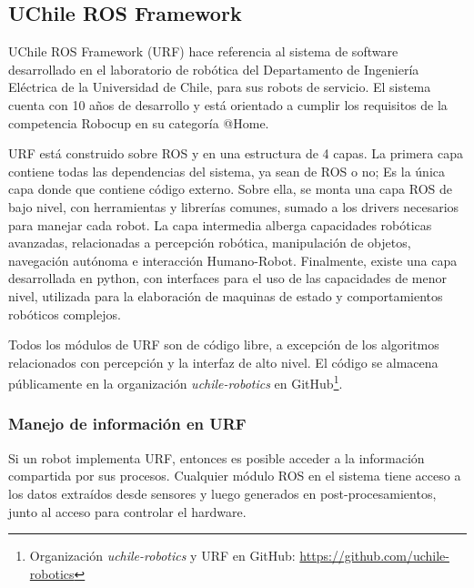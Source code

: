 

\subsection{UChile ROS Framework}

UChile ROS Framework (URF) hace referencia al sistema de software desarrollado en el laboratorio de robótica del Departamento de Ingeniería Eléctrica de la Universidad de Chile, para sus robots de servicio. El sistema cuenta con 10 años de desarrollo y está orientado a cumplir los requisitos de la competencia Robocup en su categoría @Home.

URF está construido sobre ROS y en una estructura de 4 capas. La primera capa contiene todas las dependencias del sistema, ya sean de ROS o no; Es la única capa donde que contiene código externo. Sobre ella, se monta una capa ROS de bajo nivel, con herramientas y librerías comunes, sumado a los drivers necesarios para manejar cada robot. La capa intermedia alberga capacidades robóticas avanzadas, relacionadas a percepción robótica, manipulación de objetos, navegación autónoma e interacción Humano-Robot. Finalmente, existe una capa desarrollada en python, con interfaces para el uso de las capacidades de menor nivel, utilizada para la elaboración de maquinas de estado y comportamientos robóticos complejos.


Todos los módulos de URF son de código libre, a excepción de los algoritmos relacionados con percepción y la interfaz de alto nivel. El código se almacena públicamente en la organización \textit{uchile-robotics} en GitHub\footnote{Organización \textit{uchile-robotics} y URF en GitHub: \url{https://github.com/uchile-robotics}}.




\subsubsection{Manejo de información en URF}

Si un robot implementa URF, entonces es posible acceder a la información compartida por sus procesos. Cualquier módulo ROS en el sistema tiene acceso a los datos extraídos desde sensores y luego generados en post-procesamientos, junto al acceso para controlar el hardware.

